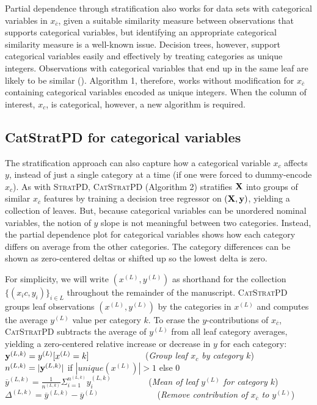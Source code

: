 \documentclass[12pt]{article}
\newcommand{\spd}{\fontfamily{cmr}\textsc{\small StratPD}}
\newcommand{\cspd}{\fontfamily{cmr}\textsc{\small CatStratPD}}
\newcommand{\xnc}{$x_{\overline{c}}$}
\begin{document}
Partial dependence through stratification also works for data sets with categorical variables in \xnc{}, given a suitable similarity measure between observations that supports categorical variables, but identifying an appropriate categorical similarity measure is a well-known issue.  Decision trees, however, support categorical variables easily and effectively by treating categories as unique integers. Observations with categorical variables that end up in the same leaf are likely to be similar (\cite{RFunsup}). Algorithm 1, therefore, works without modification for \xnc{} containing categorical variables encoded as unique integers. When the column of interest, $x_c$, is categorical, however, a new algorithm is required.

\subsection{CatStratPD for categorical variables}

The stratification approach can also capture how a categorical variable $x_c$ affects $y$, instead of just a single category at a time (if one were forced to dummy-encode $x_c$). As with \spd{},  \cspd{} (Algorithm 2) stratifies $\bf X$ into groups of similar \xnc{} features by training a decision tree regressor on $({\bf X}, {\bf y})$, yielding a collection of leaves. But, because categorical variables can be unordered nominal variables, the notion of $y$ slope is not meaningful between two categories.  Instead, the partial dependence plot for categorical variables shows how each category differs on average from the other categories. The category differences can be shown as zero-centered deltas or shifted up so the lowest delta is zero.

For simplicity, we will write $(x^{(L)}, y^{(L)})$ as shorthand for the collection $\{(x_ic, y_i)\}_{i \in L}$ throughout the remainder of the manuscript. \cspd{} groups leaf observations $(x^{(L)}, y^{(L)})$ by the categories in $x^{(L)}$ and computes the average $y^{(L)}$ value per category $k$. To erase the $y$-contributions of \xnc{}, \cspd{} subtracts the average of $y^{(L)}$ from all leaf category averages, yielding a zero-centered relative increase or decrease in $y$ for each category:\\

\noindent ${\bf y}^{(L,k)} = y^{(L)}[x^{(L)}=k]$~~~~~~~~~~~~~({\it Group leaf $x_c$ by category $k$})\\
$n^{(L,k)} = |{\bf y}^{(L,k)}|$ if $|unique(x^{(L)})| > 1$ else 0\\
$\overline{y}^{(L,k)} = \frac{1}{n^{(L,k)}} \Sigma_{i=1}^{n^{(L,k)}} y_i^{(L,k)}$ ~~~~~~~~({\it Mean of leaf $y^{(L)}$ for category $k$})\\
$\Delta^{(L,k)} = \overline{y}^{(L,k)} - \overline{y}^{(L)}$ ~~~~~~~~~~~~~({\it Remove contribution of $x_{\overline{c}}$ to $y^{(L)}$})\\
\end{document}
